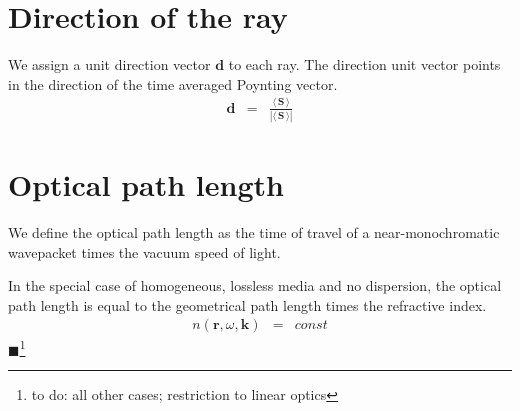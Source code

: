 \documentclass[12pt,a4paper,twoside,openright,BCOR10mm,headsepline,titlepage,abstracton,chapterprefix,final]{scrreprt}
\newcommand\Vector[1]{{\mathbf{#1}}}
\newcommand\Location{\Vector{r}}
\newcommand\wavenumber{k}
\newcommand\Wavevector{\Vector{\wavenumber}}
\newcommand{\timeavg}[1]{{\langle\,#1\,\rangle}}
\newcommand{\remark}[1]{{\color{red}$\blacksquare$}\footnote{{\color{red}#1}}}
\begin{document}
\section{Direction of the ray}
We assign a unit direction vector $\Vector{d}$ to each ray.
The direction unit vector points in the direction of the time averaged Poynting vector.
\begin{eqnarray}
 \Vector{d} &=& \frac{\timeavg{\Vector{S}}}{|\timeavg{\Vector{S}}|}
\end{eqnarray}

\section{Optical path length}
We define the optical path length as the time of travel of a near-monochromatic wavepacket times the vacuum speed of light.

In the special case of homogeneous, lossless media and no dispersion, the optical path length is equal to the geometrical 
path length times the refractive index.
\begin{eqnarray}
 n(\Location,\omega,\Wavevector) &=& const
\end{eqnarray}
\remark{to do: all other cases; restriction to linear optics}
\end{document}
